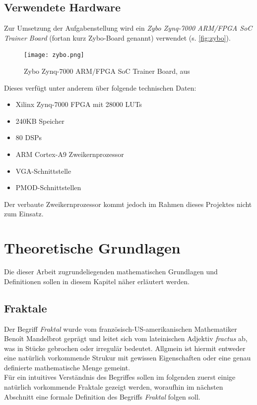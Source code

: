 \documentclass[a4paper,12pt,onesided]{report}
\begin{document}
\section{Verwendete Hardware}
\label{sec:zybo-specs}
Zur Umsetzung der Aufgabenstellung wird ein \textit{Zybo Zynq-7000 ARM/FPGA SoC Trainer Board} (fortan kurz Zybo-Board genannt) verwendet (s. \autoref{fig:zybo}).
\begin{figure}[H]
	\centering
	\texttt{[image: zybo.png]}
	\caption{Zybo Zynq-7000 ARM/FPGA SoC Trainer Board, aus \cite{zybo}}
	\label{fig:zybo}
\end{figure}
Dieses verfügt unter anderem über folgende technischen Daten:
\begin{itemize}
	\item Xilinx Zynq-7000 FPGA mit 28000 LUTs
	\item 240KB Speicher
	\item 80 DSPs
	\item ARM Cortex-A9 Zweikernprozessor
	\item VGA-Schnittstelle
	\item PMOD-Schnittstellen
\end{itemize}
Der verbaute Zweikernprozessor kommt jedoch im Rahmen dieses Projektes nicht zum Einsatz.

\chapter{Theoretische Grundlagen}
Die dieser Arbeit zugrundeliegenden mathematischen Grundlagen und Definitionen sollen in diesem Kapitel näher erläutert werden.

\section{Fraktale}
Der Begriff \textit{Fraktal} wurde vom französisch-US-amerikanischen Mathematiker Benoît Mandelbrot geprägt und leitet sich vom lateinischen Adjektiv \textit{fractus} ab, was \glqq in Stücke gebrochen\grqq{} oder \glqq irregulär\grqq{} bedeutet. Allgmein ist hiermit entweder eine natürlich vorkommende Strukur mit gewissen Eigenschaften oder eine genau definierte mathematische Menge gemeint. \cite[S. 16]{mandelbrot2013fraktale}\\
Für ein intuitives Verständnis des Begriffes sollen im folgenden zuerst einige natürlich vorkommende Fraktale gezeigt werden, woraufhin im nächsten Abschnitt eine formale Definition des Begriffs \textit{Fraktal} folgen soll.
\end{document}
